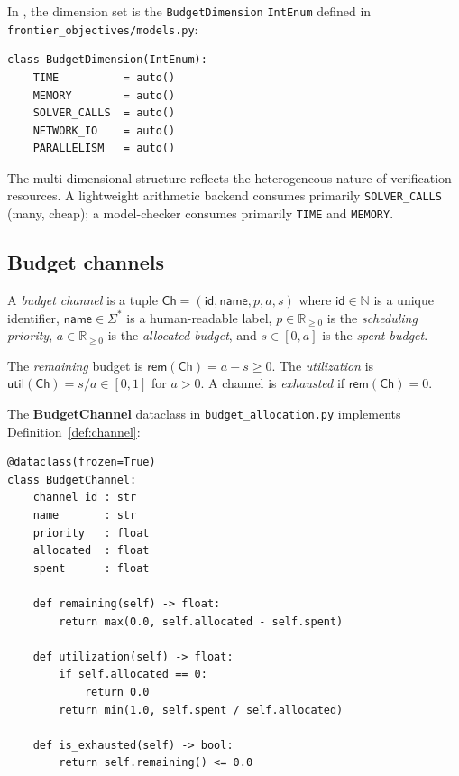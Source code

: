 \documentclass[11pt]{article}
\providecommand{\Chan}{\mathsf{Ch}}            %
\providecommand{\Util}{\mathsf{util}}          %
\providecommand{\Rem}{\mathsf{rem}}            %
\begin{document}
In \Python{}, the dimension set is the \texttt{BudgetDimension}
\texttt{IntEnum} defined in
\texttt{frontier\_objectives/models.py}:

\begin{lstlisting}[style=jugeo-python]
class BudgetDimension(IntEnum):
    TIME          = auto()
    MEMORY        = auto()
    SOLVER_CALLS  = auto()
    NETWORK_IO    = auto()
    PARALLELISM   = auto()
\end{lstlisting}

The multi-dimensional structure reflects the heterogeneous nature of
verification resources.  A lightweight arithmetic backend consumes
primarily \texttt{SOLVER\_CALLS} (many, cheap); a model-checker
consumes primarily \texttt{TIME} and \texttt{MEMORY}.

\subsection{Budget channels}

\begin{definition}\label{def:channel}
A \emph{budget channel} is a tuple
$\Chan = (\mathsf{id}, \mathsf{name}, p, a, s)$ where
$\mathsf{id} \in \mathbb{N}$ is a unique identifier,
$\mathsf{name} \in \Sigma^*$ is a human-readable label,
$p \in \mathbb{R}_{\ge 0}$ is the \emph{scheduling priority},
$a \in \mathbb{R}_{\ge 0}$ is the \emph{allocated budget}, and
$s \in [0, a]$ is the \emph{spent budget}.

The \emph{remaining} budget is $\Rem(\Chan) = a - s \ge 0$.
The \emph{utilization} is $\Util(\Chan) = s / a \in [0,1]$ for $a > 0$.
A channel is \emph{exhausted} if $\Rem(\Chan) = 0$.
\end{definition}

The \textbf{BudgetChannel} dataclass in
\texttt{budget\_allocation.py} implements Definition~\ref{def:channel}:

\begin{lstlisting}[style=jugeo-python]
@dataclass(frozen=True)
class BudgetChannel:
    channel_id : str
    name       : str
    priority   : float
    allocated  : float
    spent      : float

    def remaining(self) -> float:
        return max(0.0, self.allocated - self.spent)

    def utilization(self) -> float:
        if self.allocated == 0:
            return 0.0
        return min(1.0, self.spent / self.allocated)

    def is_exhausted(self) -> bool:
        return self.remaining() <= 0.0
\end{lstlisting}
\end{document}
